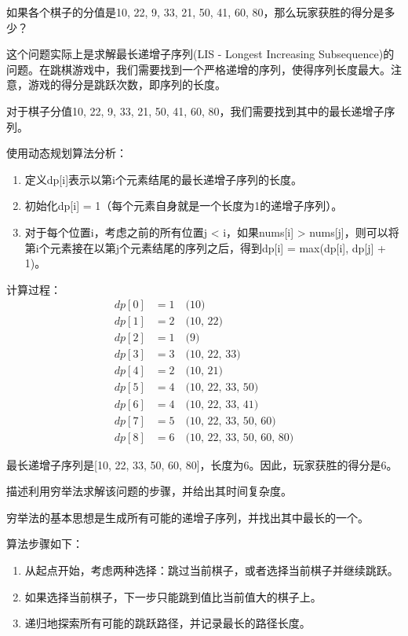 \documentclass[12pt,twoside]{article}
\begin{document}
\begin{problems}
\bparts
\ppart 如果各个棋子的分值是10, 22, 9, 33, 21, 50, 41, 60, 80，那么玩家获胜的得分是多少？

这个问题实际上是求解最长递增子序列(LIS - Longest Increasing Subsequence)的问题。在跳棋游戏中，我们需要找到一个严格递增的序列，使得序列长度最大。注意，游戏的得分是跳跃次数，即序列的长度。

对于棋子分值10, 22, 9, 33, 21, 50, 41, 60, 80，我们需要找到其中的最长递增子序列。

使用动态规划算法分析：
\begin{enumerate}
    \item 定义dp[i]表示以第i个元素结尾的最长递增子序列的长度。
    \item 初始化dp[i] = 1（每个元素自身就是一个长度为1的递增子序列）。
    \item 对于每个位置i，考虑之前的所有位置j < i，如果nums[i] > nums[j]，则可以将第i个元素接在以第j个元素结尾的序列之后，得到dp[i] = max(dp[i], dp[j] + 1)。
\end{enumerate}

计算过程：
\begin{align}
dp[0] &= 1 \quad \text{(10)} \\
dp[1] &= 2 \quad \text{(10, 22)} \\
dp[2] &= 1 \quad \text{(9)} \\
dp[3] &= 3 \quad \text{(10, 22, 33)} \\
dp[4] &= 2 \quad \text{(10, 21)} \\
dp[5] &= 4 \quad \text{(10, 22, 33, 50)} \\
dp[6] &= 4 \quad \text{(10, 22, 33, 41)} \\
dp[7] &= 5 \quad \text{(10, 22, 33, 50, 60)} \\
dp[8] &= 6 \quad \text{(10, 22, 33, 50, 60, 80)}
\end{align}

最长递增子序列是[10, 22, 33, 50, 60, 80]，长度为6。因此，玩家获胜的得分是6。

\ppart 描述利用穷举法求解该问题的步骤，并给出其时间复杂度。

穷举法的基本思想是生成所有可能的递增子序列，并找出其中最长的一个。

算法步骤如下：
\begin{enumerate}
    \item 从起点开始，考虑两种选择：跳过当前棋子，或者选择当前棋子并继续跳跃。
    \item 如果选择当前棋子，下一步只能跳到值比当前值大的棋子上。
    \item 递归地探索所有可能的跳跃路径，并记录最长的路径长度。
\end{enumerate}


\end{problems}
\end{document}
